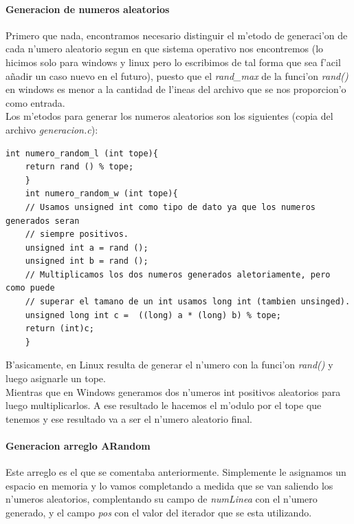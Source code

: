 \documentclass{article}
\begin{document}
	\paragraph{Generacion de numeros aleatorios}
	Primero que nada, encontramos necesario distinguir el m'etodo de generaci'on de cada n'umero aleatorio segun en que sistema operativo nos encontremos (lo hicimos solo para windows y linux pero lo escribimos de tal forma que sea f'acil añadir un caso nuevo en el futuro), puesto que el \emph{rand\_max} de la funci'on \emph{rand()} en windows es menor a la cantidad de l'ineas del archivo que se nos proporcion'o como entrada.
	\\
	Los m'etodos para generar los numeros aleatorios son los siguientes (copia del archivo \emph{generacion.c}):
	\begin{lstlisting}[style=CStyle]
	int numero_random_l (int tope){
	return rand () % tope;
	}
	int numero_random_w (int tope){
	// Usamos unsigned int como tipo de dato ya que los numeros generados seran
	// siempre positivos.
	unsigned int a = rand ();
	unsigned int b = rand ();
	// Multiplicamos los dos numeros generados aletoriamente, pero como puede
	// superar el tamano de un int usamos long int (tambien unsinged).
	unsigned long int c =  ((long) a * (long) b) % tope;
	return (int)c;
	}
	\end{lstlisting}
	
	B'asicamente, en Linux resulta de generar el n'umero con la funci'on \emph{rand()} y luego asignarle un tope. \\Mientras que en Windows generamos dos n'umeros int positivos aleatorios para luego multiplicarlos. A ese resultado le hacemos el m'odulo por el tope que tenemos y ese resultado va a ser el n'umero aleatorio final.
	
	\paragraph{Generacion arreglo ARandom}
	Este arreglo es el que se comentaba anteriormente. Simplemente le asignamos un espacio en memoria y lo vamos completando a medida que se van saliendo los n'umeros aleatorios, complentando su campo de \emph{numLinea} con el n'umero generado, y el campo \emph{pos} con el valor del iterador que se esta utilizando.
	
\end{document}
